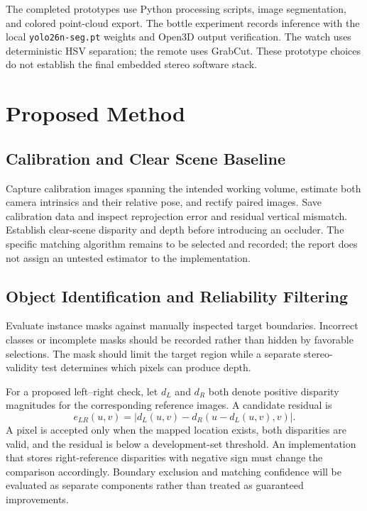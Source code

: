 The completed prototypes use Python processing scripts, image segmentation, and colored point-cloud export. The bottle experiment records inference with the local \texttt{yolo26n-seg.pt} weights and Open3D output verification. The watch uses deterministic HSV separation; the remote uses GrabCut. These prototype choices do not establish the final embedded stereo software stack.

\section{Proposed Method}
\subsection{Calibration and Clear Scene Baseline}
Capture calibration images spanning the intended working volume, estimate both camera intrinsics and their relative pose, and rectify paired images. Save calibration data and inspect reprojection error and residual vertical mismatch. Establish clear-scene disparity and depth before introducing an occluder. The specific matching algorithm remains to be selected and recorded; the report does not assign an untested estimator to the implementation.

\subsection{Object Identification and Reliability Filtering}
Evaluate instance masks against manually inspected target boundaries. Incorrect classes or incomplete masks should be recorded rather than hidden by favorable selections. The mask should limit the target region while a separate stereo-validity test determines which pixels can produce depth.

For a proposed left--right check, let $d_L$ and $d_R$ both denote positive disparity magnitudes for the corresponding reference images. A candidate residual is
\begin{equation}
e_{LR}(u,v)=|d_L(u,v)-d_R(u-d_L(u,v),v)|.
\end{equation}
A pixel is accepted only when the mapped location exists, both disparities are valid, and the residual is below a development-set threshold. An implementation that stores right-reference disparities with negative sign must change the comparison accordingly. Boundary exclusion and matching confidence will be evaluated as separate components rather than treated as guaranteed improvements.

